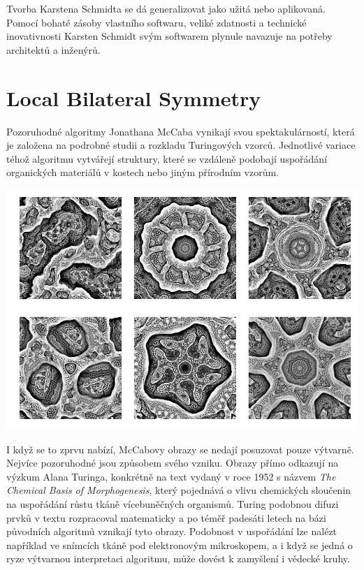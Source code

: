 \documentclass[10pt,twoside=true,open=right,cleardoublepage=empty,chapterprefix=true]{scrbook}
\newcommand{\oddil}[1]{\section{#1}\index{#1}\label{#1}}
\begin{document}
Tvorba Karstena Schmidta  se dá generalizovat jako užitá nebo aplikovaná. Pomocí bohaté zásoby vlastního softwaru, veliké zdatnosti a technické inovativnosti Karsten Schmidt svým softwarem plynule navazuje na potřeby architektů a inženýrů.



\oddil{Local Bilateral Symmetry}


Pozoruhodné algoritmy Jonathana McCaba vynikají svou spektakulárností, která je založena na podrobné studii a rozkladu Turingových vzorců. Jednotlivé variace téhož algoritmu vytvářejí struktury, které se vzdáleně podobají uspořádání organických materiálů v kostech nebo jiným přírodním vzorům.


\begin{center}
\includegraphics[width = 1\textwidth]{imgs/mcCabe1.png}
\end{center}

I když se to zprvu nabízí,  McCabovy obrazy se nedají posuzovat pouze výtvarně. Nejvíce pozoruhodné jsou způsobem svého vzniku. Obrazy přímo odkazují na výzkum Alana Turinga, konkrétně na text vydaný v roce 1952 s názvem {\em The Chemical Basis of Morphogenesis}, který pojednává o vlivu chemických sloučenin na uspořádání růstu tkáně vícebuněčných organismů. Turing podobnou difuzi prvků v textu rozpracoval matematicky a po téměř padesáti letech na bázi původních algoritmů vznikají tyto obrazy. Podobnost v uspořádání lze nalézt například ve snímcích tkáně pod elektronovým mikroskopem, a i když se jedná o ryze výtvarnou interpretaci algoritmu, může dovést k zamyšlení i vědecké kruhy.
\end{document}
